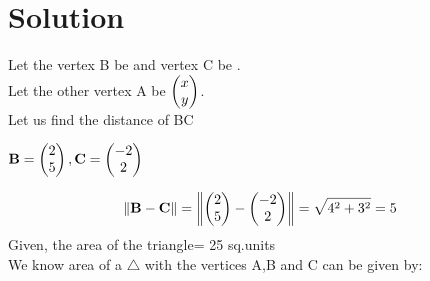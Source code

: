 \documentclass[journal,12pt,twocolumn]{IEEEtran}
\begin{document}
\noindent
\section*{\textbf{Solution}}
\noindent
Let the vertex B be  and vertex C be .\\[6pt]
Let the other vertex A be $\begin{pmatrix}x\\y\end{pmatrix}$.\\[6pt]
Let us find the distance of BC
\begin{center}
$\mathbf{B} = \begin{pmatrix}2\\5\end{pmatrix}, \mathbf{C} =\begin{pmatrix}-2\\2\end{pmatrix}$
\end{center}
$$\left\|\mathbf{B-C}\right\|=\left\|\mathbf{\begin{pmatrix}2\\5\end{pmatrix}-\begin{pmatrix}-2\\2\end{pmatrix}}\right\|=\sqrt{4^2+3^2}=5$$
Given, the area of the triangle= 25 sq.units\\
We know area of a $\triangle$ with the vertices A,B and C
can be given by:
\end{document}
